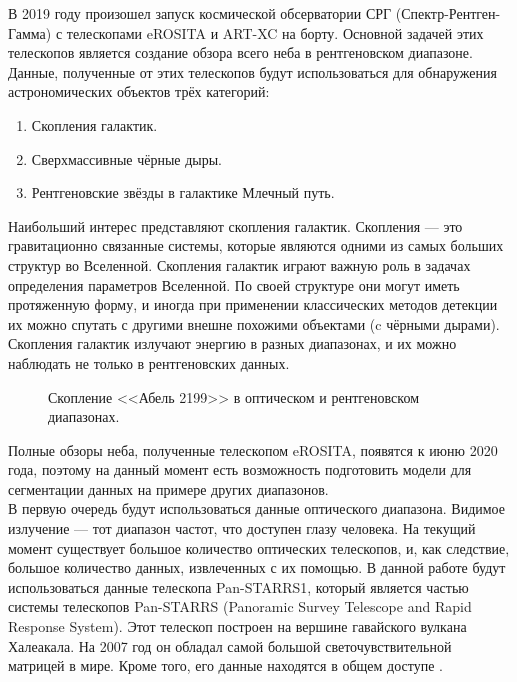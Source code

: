 \Introduction
В 2019 году произошел запуск космической обсерватории СРГ (Спектр-Рентген-Гамма) с телескопами 
eROSITA и ART-XC на борту. Основной задачей этих телескопов является создание обзора всего неба в 
рентгеновском диапазоне. Данные, полученные от этих телескопов будут использоваться для обнаружения 
астрономических объектов трёх категорий:

\begin{enumerate}
    \item Скопления галактик.
    \item Сверхмассивные чёрные дыры.
    \item Рентгеновские звёзды в галактике Млечный путь. 
\end{enumerate}

Наибольший интерес представляют скопления галактик. Скопления --- это гравитационно связанные 
системы, которые являются одними из самых больших структур во Вселенной. Скопления галактик играют 
важную роль в задачах определения параметров Вселенной.
По своей структуре они могут иметь протяженную 
форму, и иногда при применении классических методов детекции их можно спутать с другими внешне 
похожими объектами (c чёрными дырами). Скопления галактик излучают энергию в разных диапазонах, и 
их можно наблюдать не только в рентгеновских данных.\\

\begin{figure}[h]
    \caption{Скопление <<Абель 2199>> в оптическом и рентгеновском диапазонах. \cite{Abell}}
\end{figure}

Полные обзоры неба, полученные телескопом eROSITA, появятся к июню 2020 года, поэтому на данный 
момент есть возможность подготовить модели для сегментации данных на примере других диапазонов.\\

В первую очередь будут использоваться данные оптического диапазона. Видимое излучение --- тот 
диапазон частот, что доступен глазу человека. На текущий момент существует большое количество 
оптических телескопов, и, как следствие, большое количество данных, извлеченных с их помощью. В 
данной работе будут использоваться данные телескопа Pan-STARRS1, который является частью системы 
телескопов Pan-STARRS (Panoramic Survey Telescope and Rapid Response System). Этот телескоп 
построен на вершине гавайского вулкана Халеакала. На 2007 год он обладал самой большой 
светочувствительной матрицей в мире. Кроме того, его данные находятся в общем доступе \cite{Panstarrs}.\\

